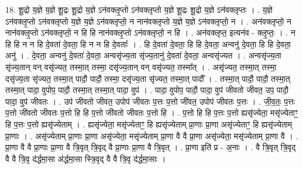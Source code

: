 \documentclass[17pt]{extarticle}
\begin{document}
18. शू॒द्रो य॒ज्ञे य॒ज्ञे शू॒द्रः शू॒द्रो य॒ज्ञे ऽन॑वक्लृ॒प्तो ऽन॑वक्लृप्तो य॒ज्ञे शू॒द्रः शू॒द्रो य॒ज्ञे ऽन॑वक्लृप्तः । . य॒ज्ञे ऽन॑वक्लृ॒प्तो ऽन॑वक्लृप्तो य॒ज्ञे य॒ज्ञे ऽन॑वक्लृप्तो॒ न नान॑वक्लृप्तो य॒ज्ञे य॒ज्ञे ऽन॑वक्लृप्तो॒ न । . अन॑वक्लृप्तो॒ न नान॑वक्लृ॒प्तो ऽन॑वक्लृप्तो॒ न हि हि नान॑वक्लृ॒प्तो ऽन॑वक्लृप्तो॒ न हि । . अन॑वक्लृप्त॒ इत्यन॑व - क्लृ॒प्तः॒ । . न हि हि न न हि दे॒वता॑ दे॒वता॒ हि न न हि दे॒वताः᳚ । . हि दे॒वता॑ दे॒वता॒ हि हि दे॒वता॒ अन्वनु॑ दे॒वता॒ हि हि दे॒वता॒ अनु॑ । . दे॒वता॒ अन्वनु॑ दे॒वता॑ दे॒वता॒ अन्वसृ॑ज्य॒ता सृ॑ज्य॒तानु॑ दे॒वता॑ दे॒वता॒ अन्वसृ॑ज्यत । . अन्वसृ॑ज्य॒ता सृ॑ज्य॒तान् वन् वसृ॑ज्यत॒ तस्मा॒त् तस्मा॒ दसृ॑ज्य॒तान् वन् वसृ॑ज्यत॒ तस्मा᳚त् । . असृ॑ज्यत॒ तस्मा॒त् तस्मा॒ दसृ॑ज्य॒ता सृ॑ज्यत॒ तस्मा॒त् पादौ॒ पादौ॒ तस्मा॒ दसृ॑ज्य॒ता सृ॑ज्यत॒ तस्मा॒त् पादौ᳚ । . तस्मा॒त् पादौ॒ पादौ॒ तस्मा॒त् तस्मा॒त् पादा॒ वुपोप॒ पादौ॒ तस्मा॒त् तस्मा॒त् पादा॒ वुप॑ । . पादा॒ वुपोप॒ पादौ॒ पादा॒ वुप॑ जीवतो जीवत॒ उप॒ पादौ॒ पादा॒ वुप॑ जीवतः । . उप॑ जीवतो जीवत॒ उपोप॑ जीवतः प॒त्तः प॒त्तो जी॑वत॒ उपोप॑ जीवतः प॒त्तः । . जी॒व॒तः॒ प॒त्तः प॒त्तो जी॑वतो जीवतः प॒त्तो हि हि प॒त्तो जी॑वतो जीवतः प॒त्तो हि । . प॒त्तो हि हि प॒त्तः प॒त्तो ह्यसृ॑ज्येता॒ मसृ॑ज्येताꣳ॒॒ हि प॒त्तः प॒त्तो ह्यसृ॑ज्येताम् । . ह्यसृ॑ज्येता॒ मसृ॑ज्येताꣳ॒॒ हि ह्यसृ॑ज्येताम् प्रा॒णाः प्रा॒णा असृ॑ज्येताꣳ॒॒ हि ह्यसृ॑ज्येताम् प्रा॒णाः । . असृ॑ज्येताम् प्रा॒णाः प्रा॒णा असृ॑ज्येता॒ मसृ॑ज्येताम् प्रा॒णा वै वै प्रा॒णा असृ॑ज्येता॒ मसृ॑ज्येताम् प्रा॒णा वै । . प्रा॒णा वै वै प्रा॒णाः प्रा॒णा वै त्रि॒वृत् त्रि॒वृद् वै प्रा॒णाः प्रा॒णा वै त्रि॒वृत् । . प्रा॒णा इति॑ प्र - अ॒नाः । . वै त्रि॒वृत् त्रि॒वृद् वै वै त्रि॒वृ द॑र्द्धमा॒सा अ॑र्द्धमा॒सा स्त्रि॒वृद् वै वै त्रि॒वृ द॑र्द्धमा॒साः । \newline
\end{document}
